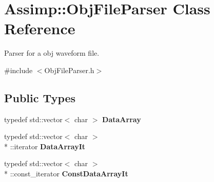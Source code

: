 \hypertarget{class_assimp_1_1_obj_file_parser}{\section{Assimp\+:\+:Obj\+File\+Parser Class Reference}
\label{class_assimp_1_1_obj_file_parser}
}


Parser for a obj waveform file.  




{\ttfamily \#include $<$Obj\+File\+Parser.\+h$>$}

\subsection*{Public Types}
\begin{DoxyCompactItemize}
\item 
\hypertarget{class_assimp_1_1_obj_file_parser_af172378e539d412b362403b6cc0f90ac}{typedef std\+::vector$<$ char $>$ {\bfseries Data\+Array}}\label{class_assimp_1_1_obj_file_parser_af172378e539d412b362403b6cc0f90ac}

\item 
\hypertarget{class_assimp_1_1_obj_file_parser_aa39d6003bd423d86188e0a4cd16a229f}{typedef std\+::vector$<$ char $>$\\*
\+::iterator {\bfseries Data\+Array\+It}}\label{class_assimp_1_1_obj_file_parser_aa39d6003bd423d86188e0a4cd16a229f}

\item 
\hypertarget{class_assimp_1_1_obj_file_parser_a095045ff4c98b3f287ef84599955bfba}{typedef std\+::vector$<$ char $>$\\*
\+::const\+\_\+iterator {\bfseries Const\+Data\+Array\+It}}\label{class_assimp_1_1_obj_file_parser_a095045ff4c98b3f287ef84599955bfba}

\end{DoxyCompactItemize}
